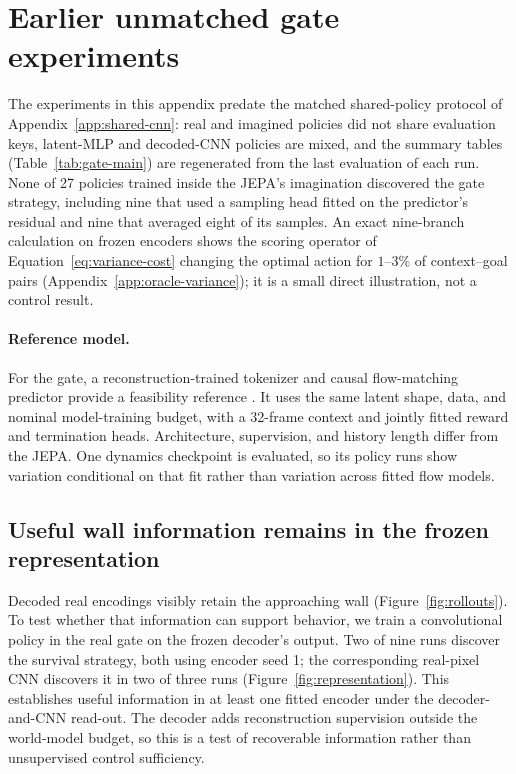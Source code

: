 \section{Earlier unmatched gate experiments}
\label{app:historical-gate}

The experiments in this appendix predate the matched shared-policy protocol of
Appendix~\ref{app:shared-cnn}: real and imagined policies did not share evaluation keys, latent-MLP
and decoded-CNN policies are mixed, and the summary tables (Table~\ref{tab:gate-main}) are
regenerated from the last evaluation of each run. None of 27 policies trained inside the JEPA's
imagination discovered the gate strategy, including nine that used a sampling head fitted on the
predictor's residual and nine that averaged eight of its samples. An exact nine-branch calculation
on frozen encoders shows the scoring operator of Equation~\ref{eq:variance-cost} changing the
optimal action for $1$--$3\%$ of context--goal pairs (Appendix~\ref{app:oracle-variance}); it is a
small direct illustration, not a control result.

\paragraph{Reference model.}
For the gate, a reconstruction-trained tokenizer and causal flow-matching predictor provide a
feasibility reference \citep{lipman2023flowmatching,chen2024diffusionforcing,hafner2025dreamer4}.
It uses the same latent shape, data, and nominal model-training budget, with a 32-frame context and
jointly fitted reward and termination heads. Architecture, supervision, and history length differ
from the JEPA. One dynamics checkpoint is evaluated, so its policy runs show variation conditional
on that fit rather than variation across fitted flow models.

\subsection{Useful wall information remains in the frozen representation}
\label{app:results-wall}

Decoded real encodings visibly retain the approaching wall (Figure~\ref{fig:rollouts}). To test
whether that information can support behavior, we train a convolutional policy in the real gate
on the frozen decoder's output. Two of nine runs discover the survival strategy, both using encoder
seed 1; the corresponding real-pixel CNN discovers it in two of three runs
(Figure~\ref{fig:representation}). This establishes useful information in at least one fitted encoder
under the decoder-and-CNN read-out. The decoder adds reconstruction supervision outside the
world-model budget, so this is a test of recoverable information rather than unsupervised control
sufficiency.

